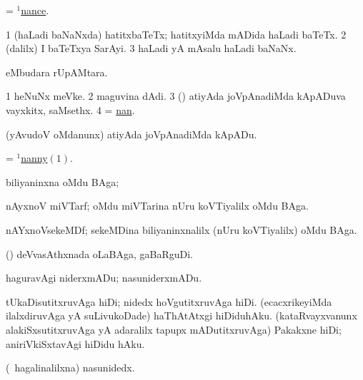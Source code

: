 \bentry
{}
\gl{\nA}
\bmng
= \hyperlink{nance(1)}{$^1$nance}.
\emng
\eentry

\bentry
{}
\gl{\nA}
\bmng
\bnum
\num{1} (haLadi baNaNxda) hatitxbaTeTx; hatitxyiMda mADida haLadi baTeTx. 
\num{2} (\bava dalilx) I baTeTxya SarAyi. 
\num{3} haLadi yA mAsalu haLadi baNaNx. 
\enum
\emng
\eentry

\bentry
{}
\gl{\nA}
\bmng
{} eMbudara rUpAMtara. 
\emng
\eentry

\bentry
{}
\gl{\nA}
\bmng
\bnum
\num{1} heNuNx meVke. 
\num{2} maguvina dAdi. 
\num{3} (\rUpa) atiyAda joVpAnadiMda kApADuva vayxkitx, saMsethx. 
\num{4} = \hyperlink{nan}{nan}.
\enum
\emng
\eentry

\bentry
{}
\gl{\sakirx}
\bmng
(yAvudoV oMdanunx) atiyAda joVpAnadiMda kApADu. 
\emng
\eentry

\bentry
{}
\gl{\nA}
\bmng
= \hyperlink{nanny(1)}{$^1$nanny\((1)\)}. 
\emng
\eentry

\bentry
{}
\bmng
biliyaninxna oMdu BAga;  
\emng
\eentry

\bentry
{}
\gl{\nA}
\bmng
nAyxnoV miVTarf; oMdu miVTarina nUru koVTiyalilx oMdu BAga. 
\emng
\eentry

\bentry
{}
\gl{\nA}
\bmng
nAYxnoVsekeMDf; sekeMDina biliyaninxnalilx (nUru koVTiyalilx) oMdu BAga. 
\emng
\eentry

\bentry
{}
\gl{\nA}
\bmng
 (\girxVca) deVvasAthxnada oLaBAga, gaBaRguDi. 
\emng
\eentry

\bentry
{}
\gl{\akirx}
\bmng
haguravAgi niderxmADu; nasuniderxmADu. 
\emng

\noindent
\gl{\pagu}
\bmng
{} 
\banum
{} tUkaDisutitxruvAga hiDi; nidedx hoVgutitxruvAga hiDi. 
 (ecacxrikeyiMda ilalxdiruvAga yA suLivukoDade) haThAtAtxgi hiDiduhAku. 
 (kataRvayxvanunx alakiSxsutitxruvAga yA adaralilx tapupx mADutitxruvAga) Pakakxne hiDi; aniriVkiSxtavAgi hiDidu hAku. 
\eanum
\emng
\eentry

\bentry
{}
\gl{\nA}
\bmng
(\kanmu\ hagalinalilxna) nasunidedx. 
\emng


